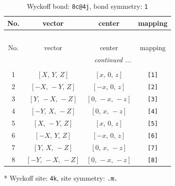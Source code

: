 \documentclass[fleqn,8pt]{jsarticle}
\begin{document}
\renewcommand{\arraystretch}{1.2}
\begin{longtable}{cccc}
\caption{Wyckoff bond: {\tt 8c@4j}, bond symmetry: {\tt 1}}
 \\
 \hline \hline
No. & vector & center & mapping \\ \hline \endfirsthead

\multicolumn{3}{l}{\tablename\ \thetable{}} \\
 \hline \hline
No. & vector & center & mapping \\ \hline \endhead

 \hline \hline
\multicolumn{3}{r}{\footnotesize\it continued ...} \\ \endfoot

 \hline \hline
\multicolumn{3}{r}{} \\ \endlastfoot

1 & $\left[ X,\, Y,\, Z \right]$ & $\left[ x,\, 0,\, z \right]$ & {\tt [1]} \\ \hline
2 & $\left[ - X,\, - Y,\, Z \right]$ & $\left[ - x,\, 0,\, z \right]$ & {\tt [2]} \\ \hline
3 & $\left[ Y,\, - X,\, - Z \right]$ & $\left[ 0,\, - x,\, - z \right]$ & {\tt [3]} \\ \hline
4 & $\left[ - Y,\, X,\, - Z \right]$ & $\left[ 0,\, x,\, - z \right]$ & {\tt [4]} \\ \hline
5 & $\left[ X,\, - Y,\, Z \right]$ & $\left[ x,\, 0,\, z \right]$ & {\tt [5]} \\ \hline
6 & $\left[ - X,\, Y,\, Z \right]$ & $\left[ - x,\, 0,\, z \right]$ & {\tt [6]} \\ \hline
7 & $\left[ Y,\, X,\, - Z \right]$ & $\left[ 0,\, x,\, - z \right]$ & {\tt [7]} \\ \hline
8 & $\left[ - Y,\, - X,\, - Z \right]$ & $\left[ 0,\, - x,\, - z \right]$ & {\tt [8]} \\
\end{longtable}
* Wyckoff site: {\tt 4k}, site symmetry: {\tt .m.}
\renewcommand{\arraystretch}{1.2}
\end{document}
